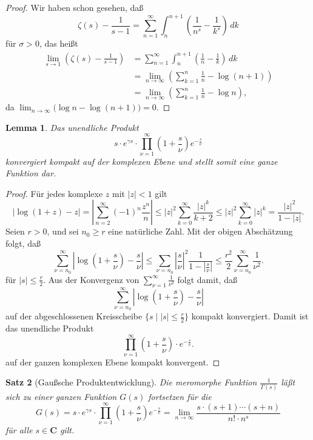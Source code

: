 \documentclass[a4paper,twoside,openright]{report}
\newtheorem{thm}{Satz}[chapter]
\newtheorem{lem}[thm]{Lemma}
\theoremstyle{definition}
\theoremstyle{remark}
\begin{document}
\begin{proof}
  Wir haben schon gesehen, daß
  \[
    \zeta(s) - \frac 1 {s - 1} = \sum_{n = 1}^\infty \int_n^{n + 1} \left(\frac 1 {n^s} - \frac 1 {k^s}\right) \, dk
  \]
  für $\sigma > 0$,
  das heißt
  \[
    \begin{split}
      \lim_{s \to 1} \left(\zeta(s) - \frac 1 {s - 1}\right)
      & = \sum_{n = 1}^\infty \int_n^{n + 1} \left(\frac 1 n - \frac 1 k\right)  \, dk
      \\
      & = \lim_{n \to \infty} \left(\sum_{k = 1}^n \frac 1 n - \log (n + 1)\right)
      \\
      & = \lim_{n \to \infty} \left(\sum_{k = 1}^n \frac 1 n - \log n \right),
    \end{split}
  \] 
  da $\lim_{n \to \infty} \bigl(\log n - \log(n + 1)\bigr) = 0$.
\end{proof}

\begin{lem}
  Das unendliche Produkt
  \[
    s \cdot e^{\gamma s} \cdot \prod_{\nu = 1}^\infty \left(1 + \frac s \nu\right) e^{- \frac s \nu}
  \]
  konvergiert kompakt auf der komplexen Ebene und stellt somit eine ganze Funktion
  dar.
\end{lem}

\begin{proof}
  Für jedes komplexe $z$ mit $|z| < 1$ gilt
  \[
    |\log(1 + z) - z| = \left|\sum_{n = 2}^\infty (-1)^n \frac{z^n} {n}\right|
    \leq |z|^2 \sum_{k = 0}^\infty \frac{|z|^{k}}{k + 2}
    \leq |z|^2 \sum_{k = 0}^\infty |z|^k
    = \frac{|z|^2}{1 - |z|}.
  \]
  Seien $r > 0$, und sei $n_0 \ge r$ eine natürliche Zahl.
  Mit der obigen Abschätzung folgt, daß
  \[
    \sum_{\nu = n_0}^\infty \left|\log\left(1 + \frac s \nu\right) - \frac s \nu\right|
    \leq \sum_{\nu = n_0} \left|\frac s \nu\right|^2 \frac{1}{1 - |\frac s \nu|}
    \leq \frac {r^2} 2 \sum_{\nu = n_0}^\infty \frac 1 {\nu^2}.
  \] 
  für $|s| \leq \frac r 2$. Aus der Konvergenz von $\sum_{\nu = 1}^\infty \frac 1 {\nu^2}$
  folgt damit, daß
  \[
    \sum_{\nu = n_0}^\infty \left|\log(1 + \frac s \nu) - \frac s \nu\right|
  \]
  auf der abgeschlossenen Kreisscheibe $\{s \mid |s| \leq \frac r 2\}$ kompakt
  konvergiert. Damit ist das unendliche Produkt 
  \[
   \prod_{\nu = 1}^\infty \left(1 + \frac s \nu\right) \cdot e^{-\frac s \nu}.
  \]
  auf der ganzen komplexen Ebene kompakt konvergent.
\end{proof} 

\begin{thm}[Gaußsche Produktentwicklung]
  Die meromorphe Funktion $\frac 1 {\Gamma(s)}$ läßt sich zu einer ganzen
  Funktion $G(s)$ fortsetzen für die
  \[
    G(s) = s \cdot e^{\gamma s} \cdot \prod_{\nu = 1}^\infty \left(1 + \frac s \nu\right) e^{- \frac s \nu}
    = \lim_{n \to \infty} \frac{s \cdot (s + 1) \dotsm (s + n)} {n! \cdot n^s}
  \]
  für alle $s \in \mathbf C$ gilt.
\end{thm}
\end{document}
